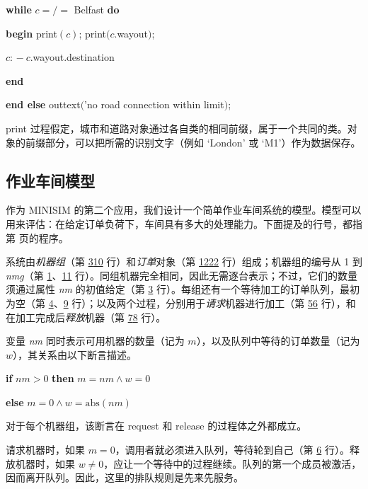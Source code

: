 \quad \quad \textbf{while} $c =/=$ Belfast \textbf{do}

\quad \quad \textbf{begin} print$(c)$; print$(c$.wayout$)$;

\quad \quad \quad $c$: $-\ c$.wayout.destination

\quad \quad \textbf{end}

\quad \textbf{end else} outtext$($'no road connection within limit$)$;

\noindent
print 过程假定，城市和道路对象通过各自类的相同前缀，属于一个共同的类。对象的前缀部分，可以把所需的识别文字（例如 `London' 或 `M1'）作为数据保存。

\subsection{作业车间模型}

作为 MINISIM 的第二个应用，我们设计一个简单作业车间系统的模型。模型可以用来评估：在给定订单负荷下，车间具有多大的处理能力。下面提及的行号，都指第 \pageref{pg:program-job-shop} 页的程序。

系统由\textit{机器组}（第 \hyperref[pg:program-job-shop-3]{3}\textendash \hyperref[pg:program-job-shop-10]{10} 行）和\textit{订单}对象（第 \hyperref[pg:program-job-shop-12]{12}\textendash \hyperref[pg:program-job-shop-22]{22} 行）组成；机器组的编号从 1 到 \textit{nmg}（第 \hyperref[pg:program-job-shop-1]{1}、\hyperref[pg:program-job-shop-11]{11} 行）。同组机器完全相同，因此无需逐台表示；不过，它们的数量须通过属性 \textit{nm} 的初值给定（第 \hyperref[pg:program-job-shop-3]{3} 行）。每组还有一个等待加工的订单队列，最初为空（第 \hyperref[pg:program-job-shop-4]{4}、\hyperref[pg:program-job-shop-9]{9} 行）；以及两个过程，分别用于\textit{请求}机器进行加工（第 \hyperref[pg:program-job-shop-5]{5}\textendash \hyperref[pg:program-job-shop-6]{6} 行），和在加工完成后\textit{释放}机器（第 \hyperref[pg:program-job-shop-7]{7}\textendash \hyperref[pg:program-job-shop-8]{8} 行）。

变量 \textit{nm} 同时表示可用机器的数量（记为 $m$），以及队列中等待的订单数量（记为 $w$），其关系由以下断言描述。

\quad \textbf{if} $nm > 0$ \textbf{then} $m = nm \land w = 0$

\quad \textbf{else} $m = 0 \land w = \text{abs}(nm)$

\noindent
对于每个机器组，该断言在 request 和 release 的过程体之外都成立。

请求机器时，如果 $m = 0$，调用者就必须进入队列，等待轮到自己（第 \hyperref[pg:program-job-shop-6]{6} 行）。释放机器时，如果 $w \neq 0$，应让一个等待中的过程继续。队列的第一个成员被激活，因而离开队列。因此，这里的排队规则是先来先服务。

